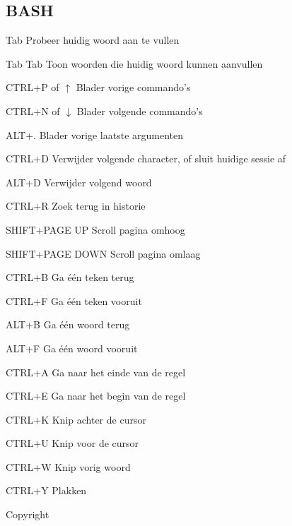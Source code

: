 \documentclass[10pt]{article}
\begin{document}
\begin{multicols}{3}
	\section{BASH}
	\begin{ttdesc}[labelwidth=\widthof{\texttt{Tab Tab}}]
	\item[Tab] Probeer huidig woord aan te vullen
	\item[Tab Tab] Toon woorden die huidig woord kunnen aanvullen
	\item[CTRL+P of $\uparrow$] Blader vorige commando's
	\item[CTRL+N of $\downarrow$] Blader volgende commando's
	\item[ALT+.] Blader vorige laatste argumenten
	\item[CTRL+D] Verwijder volgende character, of sluit huidige sessie af
	\item[ALT+D] Verwijder volgend woord
	\item[CTRL+R] Zoek terug in historie
	\item[SHIFT+PAGE UP] Scroll pagina omhoog
	\item[SHIFT+PAGE DOWN] Scroll pagina omlaag
	\item[CTRL+B] Ga \'{e}\'{e}n teken terug
	\item[CTRL+F] Ga \'{e}\'{e}n teken vooruit
	\item[ALT+B] Ga \'{e}\'{e}n woord terug
	\item[ALT+F] Ga \'{e}\'{e}n woord vooruit
	\item[CTRL+A] Ga naar het einde van de regel
	\item[CTRL+E] Ga naar het begin van de regel
	\item[CTRL+K] Knip achter de cursor 
	\item[CTRL+U] Knip voor de cursor 
	\item[CTRL+W] Knip vorig woord 
	\item[CTRL+Y] Plakken 
	\end{ttdesc}


	\noindent Copyright \textcopyright{} \thedate{} \theauthor{}

\end{multicols}
\end{document}
